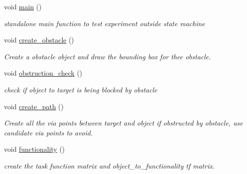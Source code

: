 \begin{DoxyCompactItemize}
void \hyperlink{classTool__Expt__2_a3aa54fd0444cf6c21987c3e77470e110}{main} ()
\begin{DoxyCompactList}\small\item\em standalone main function to test experiment outside state machine \end{DoxyCompactList}\item 
\mbox{\label{classTool__Expt__2_a22b3644a88a85a6864672f3dafbb4d25}} 
void \hyperlink{classTool__Expt__2_a22b3644a88a85a6864672f3dafbb4d25}{create\+\_\+obstacle} ()
\begin{DoxyCompactList}\small\item\em Create a obstacle object and draw the bounding box for thee obstacle. \end{DoxyCompactList}\item 
\mbox{\label{classTool__Expt__2_a71b3d3747f2e06a63799812c434df6a2}} 
void \hyperlink{classTool__Expt__2_a71b3d3747f2e06a63799812c434df6a2}{obstruction\+\_\+check} ()
\begin{DoxyCompactList}\small\item\em check if object to target is being blocked by obstacle \end{DoxyCompactList}\item 
\mbox{\label{classTool__Expt__2_a98d260a9657ddce4ef0811649851d886}} 
void \hyperlink{classTool__Expt__2_a98d260a9657ddce4ef0811649851d886}{create\+\_\+path} ()
\begin{DoxyCompactList}\small\item\em Create all the via points between target and object if obstructed by obstacle, use candidate via points to avoid. \end{DoxyCompactList}\item 
\mbox{\label{classTool__Expt__2_a56a331ac5f5fe40e070466b97f746a21}} 
void \hyperlink{classTool__Expt__2_a56a331ac5f5fe40e070466b97f746a21}{functionality} ()
\begin{DoxyCompactList}\small\item\em create the task function matrix and object\+\_\+to\+\_\+functionality tf matrix. \end{DoxyCompactList}\item 
\mbox{\label{classTool__Expt__2_ac9e4fdba0c08996bc46cd9e74f878383}} 

\end{DoxyCompactItemize}
